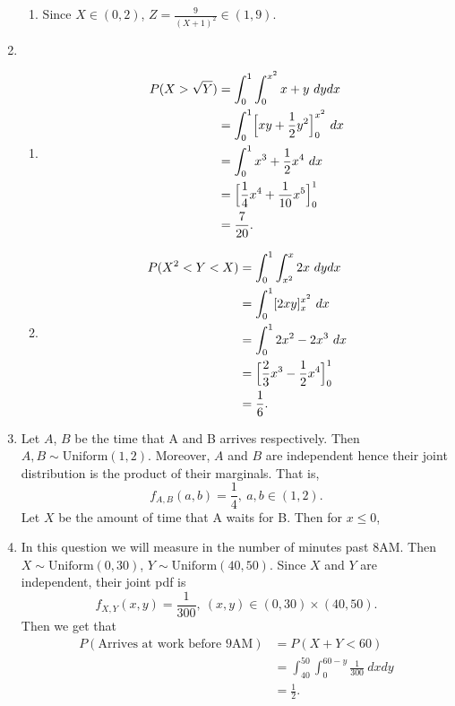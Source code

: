 \documentclass{article}
\begin{document}
\begin{enumerate}
\begin{enumerate}
        \item Since $X \in (0, 2)$, $Z = \frac{9}{(X + 1)^2} \in (1, 9)$.
    \end{enumerate}

    \item \begin{enumerate}
        \item \begin{align*}
            P(X > \sqrt{Y})
            &= \int_{0}^{1} \int_{0}^{x^2} x + y \ dydx \\
            &= \int_{0}^{1} \Bigl[ xy + \frac{1}{2}y^2 \Bigr]_0^{x^2} \ dx \\
            &= \int_{0}^{1} x^3 + \frac{1}{2}x^4 \ dx \\
            &= \Bigl[ \frac{1}{4}x^4 + \frac{1}{10}x^5 \Bigr]_0^1 \\
            &= \frac{7}{20}.
        \end{align*}

        \item \begin{align*}
            P(X^2 < Y < X) 
            &= \int_{0}^{1} \int_{x^2}^{x} 2x \ dydx \\
            &= \int_{0}^{1} [2xy]_x^{x^2} \ dx \\
            &= \int_{0}^{1} 2x^2 - 2x^3 \ dx \\
            &= \Bigl[ \frac{2}{3}x^3 - \frac{1}{2}x^4 \Bigr]_0^1 \\
            &= \frac{1}{6}.
        \end{align*}
    \end{enumerate}

    \item Let $A$, $B$ be the time that A and B arrives respectively. Then $A, B \sim \text{Uniform}(1, 2)$.
    Moreover, $A$ and $B$ are independent hence their joint distribution is the product of their marginals. 
    That is, 
    \[ f_{A, B}(a, b) = \frac{1}{4}, \ a, b \in (1, 2). \]
    Let $X$ be the amount of time that A waits for B. Then for $x \leq 0$, 

    \item In this question we will measure in the number of minutes past 8AM. Then 
    $X \sim \text{Uniform}(0, 30)$, $Y \sim \text{Uniform}(40, 50)$. Since $X$ and $Y$ are independent, 
    their joint pdf is 
    \[ f_{X, Y}(x, y) = \frac{1}{300}, \ (x, y) \in (0, 30) \times (40, 50). \]
    Then we get that  
    \begin{align*}
        P(\text{Arrives at work before 9AM}) 
        &= P(X + Y < 60) \\
        &= \int_{40}^{50} \int_{0}^{60 - y} \frac{1}{300} \ dxdy \\
        &= \frac{1}{2}.
    \end{align*}


\end{enumerate}
\end{document}

